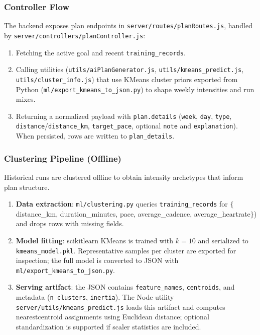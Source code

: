\subsubsection{Controller Flow}
The backend exposes plan endpoints in \verb|server/routes/planRoutes.js|, handled by \verb|server/controllers/planController.js|:
\begin{enumerate}
  \item Fetching the active goal and recent \verb|training_records|.
  \item Calling utilities (\verb|utils/aiPlanGenerator.js|, \verb|utils/kmeans_predict.js|, \verb|utils/cluster_info.js|) that use KMeans cluster priors exported from Python (\verb|ml/export_kmeans_to_json.py|) to shape weekly intensities and run mixes.
  \item Returning a normalized payload with \verb|plan.details| (\verb|week|, \verb|day|, \verb|type|, \verb|distance|/\verb|distance_km|, \verb|target_pace|, optional \verb|note| and \verb|explanation|). When persisted, rows are written to \verb|plan_details|.
\end{enumerate}

\subsubsection{Clustering Pipeline (Offline)}
Historical runs are clustered offline to obtain intensity archetypes that inform plan structure.
\begin{enumerate}
  \item \textbf{Data extraction}: \verb|ml/clustering.py| queries \verb|training_records| for \(\{\)distance\_km, duration\_minutes, pace, average\_cadence, average\_heartrate\(\}\)) and drops rows with missing fields.
  \item \textbf{Model fitting}: scikit\-learn KMeans is trained with \(k=10\) and serialized to \verb|kmeans_model.pkl|. Representative samples per cluster are exported for inspection; the full model is converted to JSON with \verb|ml/export_kmeans_to_json.py|.
  \item \textbf{Serving artifact}: the JSON contains \verb|feature_names|, \verb|centroids|, and metadata (\verb|n_clusters|, \verb|inertia|). The Node utility \verb|server/utils/kmeans_predict.js| loads this artifact and computes nearest\-centroid assignments using Euclidean distance; optional standardization is supported if scaler statistics are included.
\end{enumerate}


